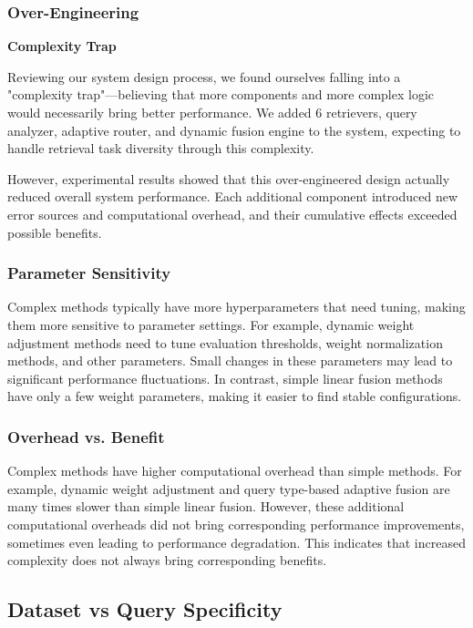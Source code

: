\documentclass[letterpaper]{article} %
\begin{document}
\subsubsection{Over-Engineering}

\textbf{Complexity Trap}

Reviewing our system design process, we found ourselves falling into a "complexity trap"—believing that more components and more complex logic would necessarily bring better performance. We added 6 retrievers, query analyzer, adaptive router, and dynamic fusion engine to the system, expecting to handle retrieval task diversity through this complexity.

However, experimental results showed that this over-engineered design actually reduced overall system performance. Each additional component introduced new error sources and computational overhead, and their cumulative effects exceeded possible benefits.

\subsubsection{Parameter Sensitivity}

Complex methods typically have more hyperparameters that need tuning, making them more sensitive to parameter settings. For example, dynamic weight adjustment methods need to tune evaluation thresholds, weight normalization methods, and other parameters. Small changes in these parameters may lead to significant performance fluctuations. In contrast, simple linear fusion methods have only a few weight parameters, making it easier to find stable configurations.

\subsubsection{Overhead vs. Benefit}

Complex methods have higher computational overhead than simple methods. For example, dynamic weight adjustment and query type-based adaptive fusion are many times slower than simple linear fusion. However, these additional computational overheads did not bring corresponding performance improvements, sometimes even leading to performance degradation. This indicates that increased complexity does not always bring corresponding benefits.

\subsection{Dataset vs Query Specificity}
\end{document}
